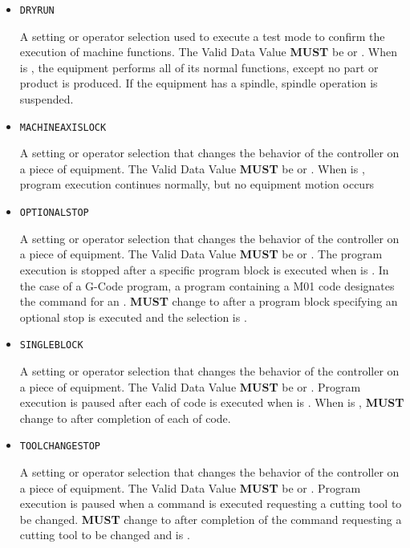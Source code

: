 \begin{itemize}

\item \texttt{DRY\textunderscore RUN}


A setting or operator selection used to execute a test mode to confirm the execution of machine functions. 
 The \gls{Valid Data Value} \textbf{MUST} be  or . 
 When  is , the equipment performs all of its normal functions, except no part or product is produced.  If the equipment has a spindle, spindle operation is suspended.

\item \texttt{MACHINE\textunderscore AXIS\textunderscore LOCK}


A setting or operator selection that changes the behavior of the controller on a piece of equipment. 
 The \gls{Valid Data Value} \textbf{MUST} be  or . 
 When  is , program execution continues normally, but no equipment motion occurs 

\item \texttt{OPTIONAL\textunderscore STOP}


A setting or operator selection that changes the behavior of the controller on a piece of equipment. 
 The \gls{Valid Data Value} \textbf{MUST} be  or .
 The program execution is stopped after a specific program block is executed when  is .    
 In the case of a G-Code program, a program  containing a M01 code designates the command for an . 
  \textbf{MUST} change to  after a program block specifying an optional stop is executed and the  selection is .

\item \texttt{SINGLE\textunderscore BLOCK}


A setting or operator selection that changes the behavior of the controller on a piece of equipment. 
 The \gls{Valid Data Value} \textbf{MUST} be  or .
 Program execution is paused after each  of code is executed when  is .   
 When  is ,  \textbf{MUST} change to  after completion of each  of code. 

\item \texttt{TOOL\textunderscore CHANGE\textunderscore STOP}


A setting or operator selection that changes the behavior of the controller on a piece of equipment. 
 The \gls{Valid Data Value} \textbf{MUST} be  or . 
 Program execution is paused when a command is executed requesting a cutting tool to be changed. 
  \textbf{MUST} change to  after completion of the command requesting a cutting tool to be changed and  is .


\end{itemize}

